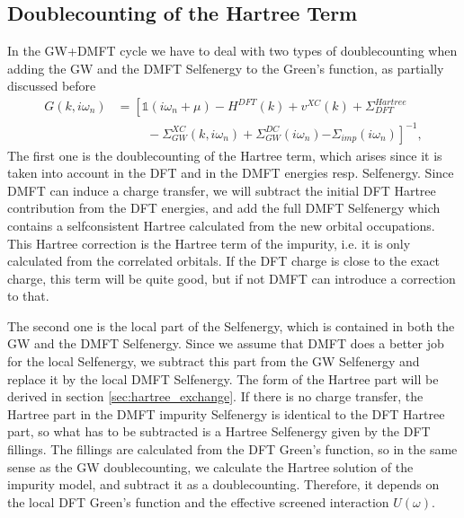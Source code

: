 \documentclass[12pt,a4paper]{scrartcl}
\numberwithin{equation}{section}
\newcommand{\unity}{\mathds{1}}
\begin{document}

 
\subsection{Doublecounting of the Hartree Term}
In the GW+DMFT cycle we have to deal with two types of doublecounting
when adding the GW and the DMFT Selfenergy to the Green's function, as
partially discussed before
\begin{align}
 G(k,i\omega_n) 
 &= \left[ \unity(i\omega_n+\mu ) -H^{DFT}(k) + v^{XC}(k) + \Sigma^{Hartree}_{DFT} \right.\nonumber\\
          & \hspace{1cm}- \Sigma^{XC}_{GW}(k,i\omega_n) 
          + \Sigma_{GW}^{DC}(i\omega_n)
          \left. - \Sigma_{imp}(i\omega_n)
           \right]^{-1},
\end{align}
The first one is the doublecounting of the Hartree term, which arises since it is
taken into account in the DFT and in the DMFT energies resp. Selfenergy.
Since DMFT can induce a charge transfer, we will subtract the initial DFT Hartree
contribution from the DFT energies, and add the full DMFT Selfenergy
which contains a selfconsistent Hartree calculated from the 
new orbital occupations. This Hartree correction is the Hartree term of the impurity,
i.e. it is only calculated from the correlated orbitals.
If the DFT charge is close to the exact charge, this term 
will be quite good, but if not DMFT can introduce a correction to that.

The second one is the local part of the Selfenergy, which
is contained in both the GW and the DMFT Selfenergy. Since we assume that DMFT
does a better job for the local Selfenergy, we subtract this part from the
GW Selfenergy and replace it by the local DMFT Selfenergy. 
The form of the Hartree part will be derived in section \ref{sec:hartree_exchange}.
If there is no charge transfer, the
Hartree part in the DMFT impurity Selfenergy is identical to the 
DFT Hartree part, so what has to be subtracted is a Hartree Selfenergy
given by the DFT fillings.
The fillings are calculated from the DFT Green's function, so
in the same sense as the GW doublecounting, we calculate the Hartree solution
of the impurity model, and subtract it as a doublecounting.
Therefore, it depends on the local DFT Green's function 
and the effective screened interaction $U(\omega)$. 
\end{document}
